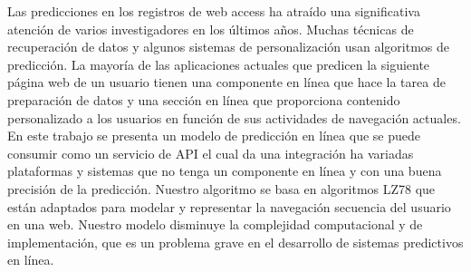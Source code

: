 {Las predicciones en los registros de web access ha atraído una significativa atención de varios investigadores en los últimos años. Muchas técnicas de recuperación de datos y algunos sistemas de personalización usan algoritmos de predicción. La mayoría de las aplicaciones actuales que predicen la siguiente página web de un usuario tienen una componente en línea que hace la tarea de preparación de datos y una sección en línea que proporciona contenido personalizado a los usuarios en función de sus actividades de navegación actuales. En este trabajo se presenta un modelo de predicción en línea que se puede consumir como un servicio de API el cual da una integración ha variadas plataformas y sistemas que no tenga un componente en línea y con una buena precisión de la predicción. Nuestro algoritmo se basa en algoritmos LZ78 que están adaptados para modelar y representar la navegación secuencia del usuario en una web. Nuestro modelo disminuye la complejidad computacional y de implementación, que es un problema grave en el desarrollo de sistemas predictivos en línea.


  }








